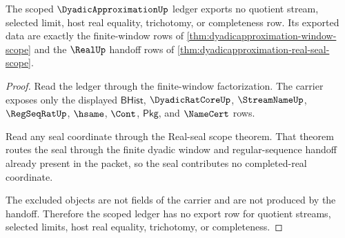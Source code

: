 \begin{theorem}\label{thm:dyadicapproximation-ledger-exclusion-scope}
The scoped $\DyadicApproximationUp$ ledger exports no quotient stream, selected
limit, host real equality, trichotomy, or completeness row. Its exported data
are exactly the finite-window rows of
\autoref{thm:dyadicapproximation-window-scope} and the $\RealUp$ handoff rows
of \autoref{thm:dyadicapproximation-real-seal-scope}.
\end{theorem}
\begin{proof}
Read the ledger through the finite-window factorization. The carrier exposes
only the displayed $\mathsf{BHist}$, $\DyadicRatCoreUp$, $\StreamNameUp$,
$\RegSeqRatUp$, $\hsame$, $\Cont$, $\mathsf{Pkg}$, and $\NameCert$ rows.

Read any seal coordinate through the Real-seal scope theorem. That theorem
routes the seal through the finite dyadic window and regular-sequence handoff
already present in the packet, so the seal contributes no completed-real
coordinate.

The excluded objects are not fields of the carrier and are not produced by the
handoff. Therefore the scoped ledger has no export row for quotient streams,
selected limits, host real equality, trichotomy, or completeness.
\end{proof}

